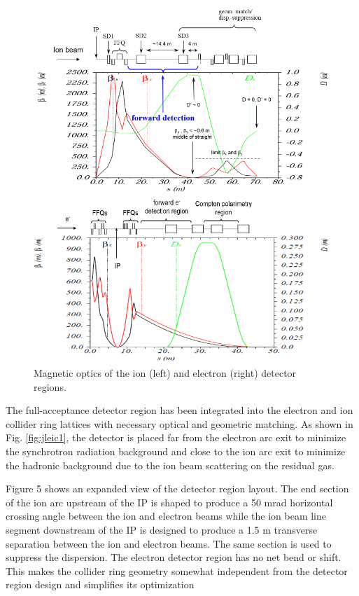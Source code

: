 \begin{figure}
	\centering
	\begin{minipage}{0.45\textwidth}
		\centering
		\includegraphics[width=.75\textwidth]{../../img/ion_magnet_optics}
	\end{minipage}\hfill
	\begin{minipage}{0.45\textwidth}
		\centering	
		\includegraphics[width=.75\textwidth]{../../img/electron_magnet_optics}	
	\end{minipage}
	\caption{Magnetic optics of the ion (left) and electron (right) detector regions.}
	\label{fig:magnet_optics}
\end{figure}

The full-acceptance detector region has been integrated into the electron and ion collider ring lattices with necessary optical and geometric matching. As shown in Fig. \ref{fig:jleic1}, the detector is placed far from the electron arc exit to minimize the synchrotron radiation background and close to the ion arc exit to minimize the hadronic background due to the ion beam scattering on the residual gas.

Figure 5 shows an expanded view of the detector region layout. The end section of the ion arc upstream of the IP is shaped to produce a 50 mrad horizontal crossing angle between the ion and electron beams while the ion beam line segment downstream of the IP is designed to produce a 1.5 m transverse separation between the ion and electron beams. The same section is used to suppress the dispersion. The electron detector region has no net bend or shift. This makes the collider ring geometry somewhat independent from the detector region design and simplifies its optimization

